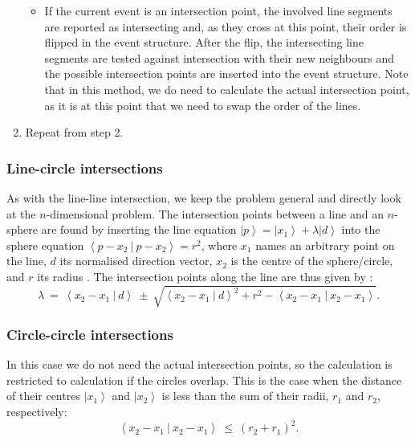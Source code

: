 \begin{enumerate}
\begin{itemize}
			\item If the current event is an intersection point, the involved line segments are reported as intersecting
				and, as they cross at this point, their order is flipped in the event structure.
				After the flip, the intersecting line segments are tested against intersection with their new neighbours
				and the possible intersection points are inserted into the event structure.
				Note that in this method, we do need to calculate the actual intersection point, as it is at this point
				that we need to swap the order of the lines.
		\end{itemize}
	\item Repeat from step 2.
\end{enumerate}


\subsubsection*{Line-circle intersections}
As with the line-line intersection, we keep the problem general and directly look at the $n$-dimensional problem.
The intersection points between a line and an $n$-sphere are found by inserting the line equation 
$\left|p\right> = \left|x_1\right> + \lambda \left|d\right>$ into the sphere equation 
$\left< p-x_2 \ |\  p-x_2 \right> = r^2$, where $x_1$ names an arbitrary point on the line, $d$ its normalised 
direction vector, $x_2$ is the centre of the sphere/circle, and $r$ its radius \cite{wiki_line_sphere_intersection}.
The intersection points along the line are thus given by \cite{wiki_line_sphere_intersection}:
\begin{equation}
	\lambda \ =\ \left< x_2 - x_1 \  |\  d \right>
		\ \pm\ \sqrt{ \left< x_2 - x_1 \  |\  d \right>^2 
			+ r^2 - \left< x_2 - x_1 \ |\  x_2 - x_1 \right>}.
\end{equation}



\subsubsection*{Circle-circle intersections}
In this case we do not need the actual intersection points, so the calculation is restricted to calculation if
the circles overlap. This is the case when the distance of their centres $\left| x_1 \right>$ and $\left| x_2 \right>$ 
is less than the sum of their radii, $r_1$ and $r_2$, respectively:
\begin{equation}
	\left< x_2 - x_1 \ |\ x_2 - x_1  \right> \ \leq \ \left( r_2 + r_1 \right)^2.
\end{equation}




